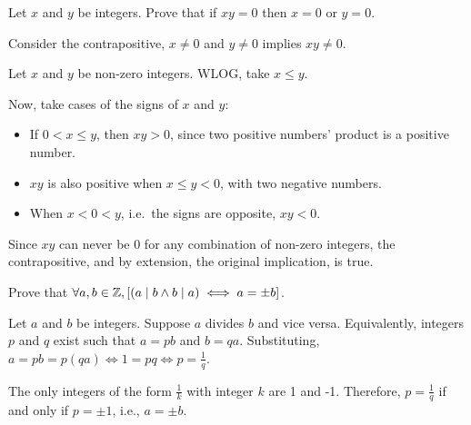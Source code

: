 \begin{recommended}
  Let $x$ and $y$ be integers. Prove that if $xy = 0$ then $x = 0$ or $y = 0$.
\end{recommended}
\begin{prf}
  Consider the contrapositive, $x \neq 0$ and $y \neq 0$ implies $xy \neq 0$.

  Let $x$ and $y$ be non-zero integers.
  WLOG, take $x \leq y$.

  Now, take cases of the signs of $x$ and $y$:
  \begin{itemize}
    \item If $0 < x \leq y$, then $xy > 0$, since two positive numbers' product is a positive number.
    \item $xy$ is also positive when $x \leq y < 0$, with two negative numbers.
    \item When $x < 0 < y$, i.e.\ the signs are opposite, $xy < 0$.
  \end{itemize}

  Since $xy$ can never be 0 for any combination of non-zero integers, the contrapositive, and by extension, the original implication, is true.
\end{prf}


\begin{recommended}
  Prove that $\forall a,b\in\mathbb{Z},[(a \mid b \land b \mid a) \iff a = \pm b]$.
\end{recommended}
\begin{prf}
  Let $a$ and $b$ be integers.
  Suppose $a$ divides $b$ and vice versa.
  Equivalently, integers $p$ and $q$ exist such that $a = pb$ and $b = qa$.
  Substituting, $a = pb = p(qa) \iff 1 = pq \iff p = \frac{1}{q}$.

  The only integers of the form $\frac{1}{k}$ with integer $k$ are 1 and -1.
  Therefore, $p = \frac{1}{q}$ if and only if $p = \pm1$, i.e., $a = \pm b$.
\end{prf}


